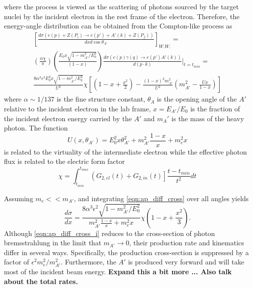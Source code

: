 where the process is viewed as the scattering of
photons sourced by the target nuclei by the incident electron in the rest frame
of the electron.  Therefore, the energy-angle distribution can be obtained from
the Compton-like process as
\begin{equation}
    \begin{split}
        \left[ \frac{d\sigma(e(p) + Z(P_i) \rightarrow e(p') + A'(k) + Z(P_f))}{dx d\cos\theta_{A'}} \right]_{W.W.} = \\
        \left( \frac{\alpha \chi}{\pi} \right) \left(\frac{E_0 x \sqrt{ 1 - m_{A'}^2/E_0^2}}{(1 - x)} \right) 
        \frac{d\sigma(e(p)\gamma(q) \rightarrow e(p') A'(k))}{d(p \cdot k)} |_{t = t_{min}} = \\
    \frac{8 \alpha^{3} \epsilon^{2} E_{0}^2 x \sqrt{1-m_{A'}^{2}/E_{0}^{2}}}{U^{2}} \chi
    \left [ \left (1 - x + \frac{x^{2}}{2} \right )  - \frac{(1-x)^{2} m_{A'}^{2}}{U^{2}}
    \left(m_{A'}^{2} - \frac{Ux}{1-x} \right) \right]
    \end{split}
    \label{eqn:ap_diff_cross}
\end{equation}
where $\alpha \sim 1/137$ is the fine structure constant, $\theta_{A}$ is the
opening angle of the $A'$ relative to the incident electron in the lab frame, 
$x = E_{A'}/E_{0}$ is the fraction of the incident electron energy carried by
the $A'$ and $m_A'$ is the mass of the heavy photon. The function 
\begin{equation}
    U(x, \theta_{A'}) = E_{0}^{2}x\theta_{A'}^{2} 
    + m_{A'}^{2}\frac{1-x}{x} + m_{e}^2 x
\end{equation}
is related to the virtuality of the intermediate electron while the effective
photon flux is related to the electric form factor
\begin{equation}
    \chi = \int_{t_{min}}^{t_{max}} \left(G_{2,el}(t) + G_{2,in}(t) \right] \frac{t - t_{min}}{t^2} dt
\end{equation}

Assuming $m_{e} << m_{A'}$, 
and integrating \ref{eqn:ap_diff_cross} over all angles yields
\begin{equation}
    \label{eqn:ap_diff_cross_i}
    \frac{d\sigma}{dx} = \frac{8\alpha^{3}\epsilon^{2} \sqrt{1-m_{A'}^{2}/E_{0}^{2}}}
    {m_{A'}^{2}\frac{1-x}{x} + m_{e}^{2}x}\chi
    \left( 1 - x + \frac{x^{2}}{3}\right).
\end{equation}
Although \ref{eqn:ap_diff_cross_i} reduces to the cross-section of photon 
bremsstrahlung in the limit that $m_{A'} \rightarrow 0$, their production rate
and kinematics differ in several ways. Specifically, the production 
cross-section is suppressed by a factor of $\epsilon^{2}m_{e}^{2}/m_{A'}^{2}$.
Furthermore, the $A'$ is produced very forward and will take most of the 
incident beam energy. \textbf{Expand this a bit more ... Also talk about the
total rates.}

